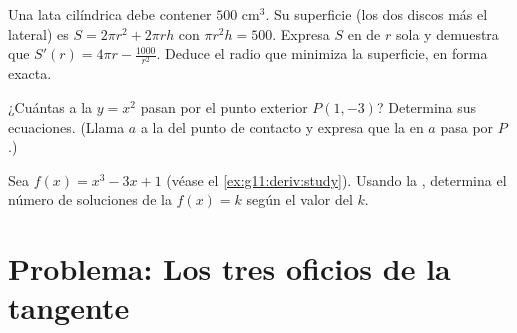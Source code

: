 \begin{exercise}[$\star\star$]\label{exo:g11:deriv:10}
Una lata cilíndrica debe contener $500$ cm$^3$. Su superficie (los dos
discos más el lateral) es $S = 2\pi r^2 + 2\pi r h$ con $\pi r^2 h = 500$.
Expresa $S$ en  de $r$ sola y demuestra que
$S'(r) = 4\pi r - \frac{1000}{r^2}$. Deduce el radio que minimiza la
superficie, en forma exacta.
\end{exercise}

\begin{exercise}[$\star\star\star$]\label{exo:g11:deriv:11}
¿Cuántas  a la  $y = x^2$ pasan por el punto exterior
$P(1, -3)$? Determina sus ecuaciones. (Llama $a$ a la  del punto de
contacto y expresa que la  en $a$ pasa por $P$.)
\end{exercise}

\begin{exercise}[$\star\star\star$]\label{exo:g11:deriv:12}
Sea $f(x) = x^3 - 3x + 1$ (véase el \cref{ex:g11:deriv:study}). Usando la
, determina el número de soluciones de la 
$f(x) = k$ según el valor del  $k$.
\end{exercise}

\section{Problema: Los tres oficios de la tangente}

